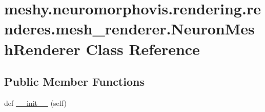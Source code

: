 \hypertarget{classmeshy_1_1neuromorphovis_1_1rendering_1_1renderes_1_1mesh__renderer_1_1NeuronMeshRenderer}{}\section{meshy.\+neuromorphovis.\+rendering.\+renderes.\+mesh\+\_\+renderer.\+Neuron\+Mesh\+Renderer Class Reference}
\label{classmeshy_1_1neuromorphovis_1_1rendering_1_1renderes_1_1mesh__renderer_1_1NeuronMeshRenderer}


 


\subsection*{Public Member Functions}
\begin{DoxyCompactItemize}
\item 
def \hyperlink{classmeshy_1_1neuromorphovis_1_1rendering_1_1renderes_1_1mesh__renderer_1_1NeuronMeshRenderer_ad164ee5a4722cec916036cd3fab4631d}{\+\_\+\+\_\+init\+\_\+\+\_\+} (self)\hypertarget{classmeshy_1_1neuromorphovis_1_1rendering_1_1renderes_1_1mesh__renderer_1_1NeuronMeshRenderer_ad164ee5a4722cec916036cd3fab4631d}{}\label{classmeshy_1_1neuromorphovis_1_1rendering_1_1renderes_1_1mesh__renderer_1_1NeuronMeshRenderer_ad164ee5a4722cec916036cd3fab4631d}

\end{DoxyCompactItemize}
